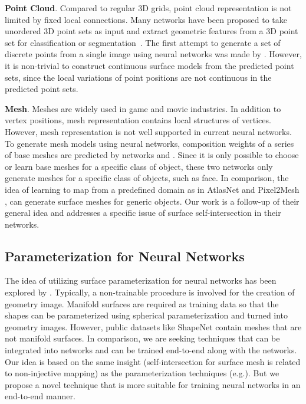 \noindent\textbf{Point Cloud}. 
Compared to regular 3D grids, point cloud representation is not limited by fixed local connections.
Many networks have been proposed to take unordered 3D point sets as input and extract geometric features from a 3D point set for classification or segmentation~\cite{pointnet,NIPS2017_7095,pointcnn}.
%
The first attempt to generate a set of discrete points from a single image using neural networks was made by \cite{PSGN}. However, it is non-trivial to construct continuous surface models from the predicted point sets, since the local variations of point positions are not continuous in the predicted point sets.

\noindent\textbf{Mesh}.
Meshes are widely used in game and movie industries.
In addition to vertex positions, mesh representation contains local structures of vertices. 
However, mesh representation is not well supported in current neural networks.
% 
To generate mesh models using neural networks, composition weights of a series of base meshes are predicted by networks \cite{img2mesh} and \cite{endface}. %
Since it is only possible to choose or learn base meshes for a specific class of object, these two networks only generate meshes for a specific class of objects, such as face.
%
In comparison, the idea of learning to map from a predefined domain as in AtlasNet  \cite{atlasnet} and Pixel2Mesh \cite{pixel2mesh}, can generate surface meshes for generic objects. Our work is a follow-up of their general idea and addresses a specific issue of surface self-intersection in their networks.

\subsection{Parameterization for Neural Networks}
The idea of utilizing surface parameterization for neural networks has been explored by \cite{surfnet,geoimg}. 
Typically, a non-trainable procedure is involved for the creation of geometry image. 
Manifold surfaces are required as training data so that the shapes can be parameterized using spherical parameterization and turned into geometry images. However, public datasets like ShapeNet \cite{shapenetdata} contain meshes that are not manifold surfaces. 
In comparison, we are seeking techniques that can be integrated into networks and can be trained end-to-end along with the networks. Our idea is based on the same insight (self-intersection for surface mesh is related to non-injective mapping) as the parameterization techniques (e.g.\cite{provableplanarmapping,lifted_bijection,freeboundary,boundeddistortion,Liu_PP_2018}). But we propose a novel technique that is more suitable for training neural networks in an end-to-end manner. 

